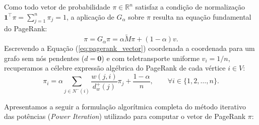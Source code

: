 \documentclass[10pt,a4paper]{article}
\theoremstyle{definition}
\theoremstyle{plain}
\theoremstyle{remark}
\begin{document}
Como todo vetor de probabilidade $\pi \in \mathbb{R}^n$ satisfaz a condição de normalização $\mathbf{1}^{\top} \pi = \sum_{j=1}^{n} \pi_j = 1$, a aplicação de $G_{\alpha}$ sobre $\pi$ resulta na equação fundamental do PageRank:
\begin{equation}
\pi = G_{\alpha} \pi = \alpha \widetilde{M} \pi + (1 - \alpha) v.
\label{eq:pagerank_vector}
\end{equation}
Escrevendo a Equação (\ref{eq:pagerank_vector}) coordenada a coordenada para um grafo sem nós pendentes ($d = \mathbf{0}$) e com teletransporte uniforme $v_i = 1/n$, recuperamos a célebre expressão algébrica do PageRank de cada vértice $i \in V$:
\begin{equation}
\pi_i = \alpha \sum_{j \in N^{-}(i)} \frac{w(j, i)}{d^{+}_{w}(j)} \pi_j + \frac{1 - \alpha}{n}, \qquad \forall i \in \{1, 2, \dots, n\}.
\label{eq:pagerank_scalar}
\end{equation}

Apresentamos a seguir a formulação algorítmica completa do método iterativo das potências (\textit{Power Iteration}) utilizado para computar o vetor de PageRank $\pi$:
\end{document}
